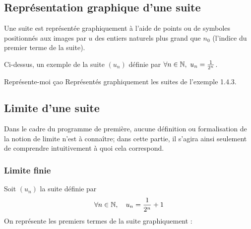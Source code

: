 \subsection{Représentation graphique d'une suite}
Une suite est représentée graphiquement à l'aide de points ou de symboles positionnés aux images par $u$ des entiers naturels plus grand que $n_0$ (l'indice du premier terme de la suite).
\begin{center}
\end{center}
Ci-dessus, un exemple de la suite $(u_n)$ définie par $\forall n\in\N,\ u_n=\frac1{2^n}$.
\begin{exemple}{Représente-moi ça}{o}
Représentés graphiquement les suites de l'exemple 1.4.3.
\end{exemple}

\subsection{Limite d'une suite}
Dans le cadre du programme de première, aucune définition ou formalisation de la notion de limite n'est à connaître; dans cette partie, il s'agira ainsi seulement de comprendre intuitivement à quoi cela correspond. 

\subsubsection{Limite finie}
Soit $(u_n)$ la suite définie par \[\forall n\in\mathbb{N},\quad u_n=\frac1{2^n}+1\]
On représente les premiers termes de la suite graphiquement : 

\begin{center}
\end{center}

